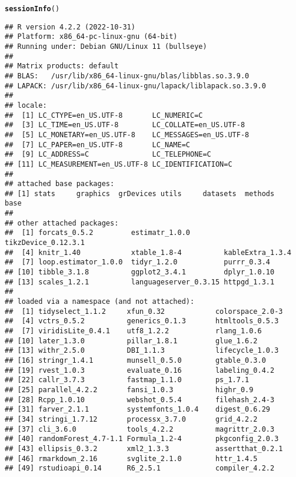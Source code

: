 \documentclass[12pt]{article}\usepackage[]{graphicx}\usepackage[]{xcolor}
\makeatletter
\newcommand{\hlstd}[1]{\textcolor[rgb]{0.345,0.345,0.345}{#1}}%
\newcommand{\hlkwd}[1]{\textcolor[rgb]{0.737,0.353,0.396}{\textbf{#1}}}%
\newenvironment{kframe}{%
 \def\at@end@of@kframe{}%
 \ifinner\ifhmode%
  \def\at@end@of@kframe{\end{minipage}}%
  \begin{minipage}{\columnwidth}%
 \fi\fi%
 \def\FrameCommand##1{\hskip\@totalleftmargin \hskip-\fboxsep
 \colorbox{shadecolor}{##1}\hskip-\fboxsep
     \hskip-\linewidth \hskip-\@totalleftmargin \hskip\columnwidth}%
 \MakeFramed {\advance\hsize-\width
   \@totalleftmargin\z@ \linewidth\hsize
   \@setminipage}}%
 {\par\unskip\endMakeFramed%
 \at@end@of@kframe}
\newenvironment{knitrout}{}{} %
\makeatother
\begin{document}
\begin{knitrout}
\color{fgcolor}\begin{kframe}
\begin{alltt}
\hlkwd{sessionInfo}\hlstd{()}
\end{alltt}
\begin{verbatim}
## R version 4.2.2 (2022-10-31)
## Platform: x86_64-pc-linux-gnu (64-bit)
## Running under: Debian GNU/Linux 11 (bullseye)
## 
## Matrix products: default
## BLAS:   /usr/lib/x86_64-linux-gnu/blas/libblas.so.3.9.0
## LAPACK: /usr/lib/x86_64-linux-gnu/lapack/liblapack.so.3.9.0
## 
## locale:
##  [1] LC_CTYPE=en_US.UTF-8       LC_NUMERIC=C              
##  [3] LC_TIME=en_US.UTF-8        LC_COLLATE=en_US.UTF-8    
##  [5] LC_MONETARY=en_US.UTF-8    LC_MESSAGES=en_US.UTF-8   
##  [7] LC_PAPER=en_US.UTF-8       LC_NAME=C                 
##  [9] LC_ADDRESS=C               LC_TELEPHONE=C            
## [11] LC_MEASUREMENT=en_US.UTF-8 LC_IDENTIFICATION=C       
## 
## attached base packages:
## [1] stats     graphics  grDevices utils     datasets  methods   base     
## 
## other attached packages:
##  [1] forcats_0.5.2         estimatr_1.0.0        tikzDevice_0.12.3.1  
##  [4] knitr_1.40            xtable_1.8-4          kableExtra_1.3.4     
##  [7] loop.estimator_1.0.0  tidyr_1.2.0           purrr_0.3.4          
## [10] tibble_3.1.8          ggplot2_3.4.1         dplyr_1.0.10         
## [13] scales_1.2.1          languageserver_0.3.15 httpgd_1.3.1         
## 
## loaded via a namespace (and not attached):
##  [1] tidyselect_1.1.2     xfun_0.32            colorspace_2.0-3    
##  [4] vctrs_0.5.2          generics_0.1.3       htmltools_0.5.3     
##  [7] viridisLite_0.4.1    utf8_1.2.2           rlang_1.0.6         
## [10] later_1.3.0          pillar_1.8.1         glue_1.6.2          
## [13] withr_2.5.0          DBI_1.1.3            lifecycle_1.0.3     
## [16] stringr_1.4.1        munsell_0.5.0        gtable_0.3.0        
## [19] rvest_1.0.3          evaluate_0.16        labeling_0.4.2      
## [22] callr_3.7.3          fastmap_1.1.0        ps_1.7.1            
## [25] parallel_4.2.2       fansi_1.0.3          highr_0.9           
## [28] Rcpp_1.0.10          webshot_0.5.4        filehash_2.4-3      
## [31] farver_2.1.1         systemfonts_1.0.4    digest_0.6.29       
## [34] stringi_1.7.12       processx_3.7.0       grid_4.2.2          
## [37] cli_3.6.0            tools_4.2.2          magrittr_2.0.3      
## [40] randomForest_4.7-1.1 Formula_1.2-4        pkgconfig_2.0.3     
## [43] ellipsis_0.3.2       xml2_1.3.3           assertthat_0.2.1    
## [46] rmarkdown_2.16       svglite_2.1.0        httr_1.4.5          
## [49] rstudioapi_0.14      R6_2.5.1             compiler_4.2.2
\end{verbatim}
\end{kframe}
\end{knitrout}
\end{document}
